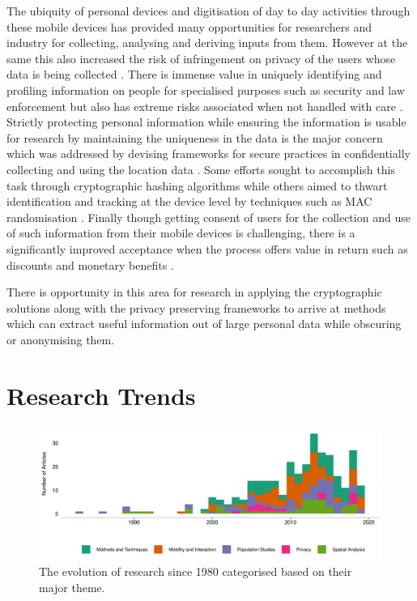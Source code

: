 The ubiquity of personal devices and digitisation of day to day activities through these mobile devices \citep{mcmeel2018} has provided many opportunities for researchers and industry for collecting, analysing and deriving inputs from them.
However at the same this also increased the risk of infringement on privacy of the users whose data is being collected \cite[-2cm]{saponas2007, krumm2009}.
There is immense value in uniquely identifying and profiling information on people for specialised purposes such as security \citep{cutter2006} and law enforcement \citep{dobson2003} but also has extreme risks associated when not handled with care \citep{vanwey2005}.
Strictly protecting personal information while ensuring the information is usable for research by maintaining the uniqueness in the data is the major concern which was addressed by devising frameworks for secure practices in confidentially collecting and using the location data \citep{duckham2006, tang2006, lane2014}.  Some efforts sought to accomplish this task through cryptographic hashing algorithms \citep{pang2007} while others aimed to thwart identification and tracking at the device level by techniques such as MAC randomisation \citep{gruteser2005, greenstein2008}.
Finally though getting consent of users for the collection and use of such information from their mobile devices is challenging, there is a significantly improved acceptance when the process offers value in return such as discounts and monetary benefits \citep{kobsa2014}.

There is opportunity in this area for research in applying the cryptographic solutions along with the privacy preserving frameworks to arrive at methods which can extract useful information out of large personal data while obscuring or anonymising them.

\section{Research Trends}

\begin{figure}
  \includegraphics{images/literature-themes-timeline.png}
  \caption{The evolution of research since 1980 categorised based on their major theme.}
  \label{figure:literature:themes:timeline}
\end{figure}

